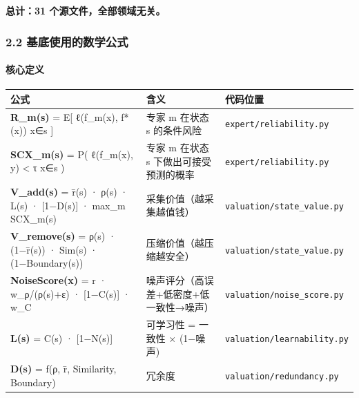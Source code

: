 \documentclass[
  12pt,
]{ctexart}
\begin{document}
\textbf{总计：31 个源文件，全部领域无关。}

\subsubsection{2.2
基底使用的数学公式}\label{ux57faux5e95ux4f7fux7528ux7684ux6570ux5b66ux516cux5f0f}

\paragraph{核心定义}\label{ux6838ux5fc3ux5b9aux4e49}

\begin{longtable}[]{@{}
  >{\raggedright\arraybackslash}p{}
  >{\raggedright\arraybackslash}p{}
  >{\raggedright\arraybackslash}p{}@{}}
\toprule\noalign{}
\begin{minipage}[b]{\linewidth}\raggedright
公式
\end{minipage} & \begin{minipage}[b]{\linewidth}\raggedright
含义
\end{minipage} & \begin{minipage}[b]{\linewidth}\raggedright
代码位置
\end{minipage} \\
\midrule\noalign{}
\endhead
\bottomrule\noalign{}
\endlastfoot
\textbf{R\_m(s)} = E{[} ℓ(f\_m(x), f*(x)) \textbar{} x∈s {]} & 专家 m
在状态 s 的条件风险 & \texttt{expert/reliability.py} \\
\textbf{SCX\_m(s)} = P( ℓ(f\_m(x), y) \textless{} τ \textbar{} x∈s ) &
专家 m 在状态 s 下做出可接受预测的概率 &
\texttt{expert/reliability.py} \\
\textbf{V\_add(s)} = r̄(s) · ρ(s) · L(s) · {[}1−D(s){]} · max\_m
SCX\_m(s) & 采集价值（越采集越值钱） &
\texttt{valuation/state\_value.py} \\
\textbf{V\_remove(s)} = ρ(s) · (1−r̄(s)) · Sim(s) · (1−Boundary(s)) &
压缩价值（越压缩越安全） & \texttt{valuation/state\_value.py} \\
\textbf{NoiseScore(x)} = r · w\_ρ/(ρ(s)+ε) · {[}1−C(s){]} · w\_C &
噪声评分（高误差+低密度+低一致性→噪声） &
\texttt{valuation/noise\_score.py} \\
\textbf{L(s)} = C(s) · {[}1−N(s){]} & 可学习性 = 一致性 × (1−噪声) &
\texttt{valuation/learnability.py} \\
\textbf{D(s)} = f(ρ, r̄, Similarity, Boundary) & 冗余度 &
\texttt{valuation/redundancy.py} \\
\end{longtable}
\end{document}
